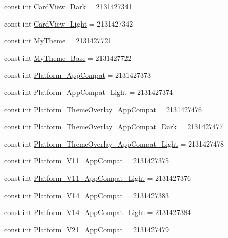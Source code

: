 \begin{CompactItemize}
\item 
const int \hyperlink{class__2doo_1_1_droid_1_1_resource_1_1_style_6378008010174970fbe1b489687a9181}{CardView\_\-Dark} = 2131427341
\item 
const int \hyperlink{class__2doo_1_1_droid_1_1_resource_1_1_style_01532052b5b8563a55f822d24905349c}{CardView\_\-Light} = 2131427342
\item 
const int \hyperlink{class__2doo_1_1_droid_1_1_resource_1_1_style_ef15d60d8f145604b7cfd9701fddc784}{MyTheme} = 2131427721
\item 
const int \hyperlink{class__2doo_1_1_droid_1_1_resource_1_1_style_5cb0bee74161e98760a723023f2b74db}{MyTheme\_\-Base} = 2131427722
\item 
const int \hyperlink{class__2doo_1_1_droid_1_1_resource_1_1_style_188184b20b44c40aa843c9a8d5871037}{Platform\_\-AppCompat} = 2131427373
\item 
const int \hyperlink{class__2doo_1_1_droid_1_1_resource_1_1_style_2dfc295e7ac870e19c4c441a793ae52c}{Platform\_\-AppCompat\_\-Light} = 2131427374
\item 
const int \hyperlink{class__2doo_1_1_droid_1_1_resource_1_1_style_78fb27541e9eb61bf3c01f32b33bc623}{Platform\_\-ThemeOverlay\_\-AppCompat} = 2131427476
\item 
const int \hyperlink{class__2doo_1_1_droid_1_1_resource_1_1_style_b1e77cb778266644a02e925f313a2543}{Platform\_\-ThemeOverlay\_\-AppCompat\_\-Dark} = 2131427477
\item 
const int \hyperlink{class__2doo_1_1_droid_1_1_resource_1_1_style_1fde3578028d57a7db2e03fe9bd59cd4}{Platform\_\-ThemeOverlay\_\-AppCompat\_\-Light} = 2131427478
\item 
const int \hyperlink{class__2doo_1_1_droid_1_1_resource_1_1_style_175dd82615942df31933b57238edc5e5}{Platform\_\-V11\_\-AppCompat} = 2131427375
\item 
const int \hyperlink{class__2doo_1_1_droid_1_1_resource_1_1_style_2f55b462f1f5d3eaefc5a0e283cf54e5}{Platform\_\-V11\_\-AppCompat\_\-Light} = 2131427376
\item 
const int \hyperlink{class__2doo_1_1_droid_1_1_resource_1_1_style_7426cf85605edeb6052e8782dc0b6e4e}{Platform\_\-V14\_\-AppCompat} = 2131427383
\item 
const int \hyperlink{class__2doo_1_1_droid_1_1_resource_1_1_style_58c31f6644636a0dd7be3a85efd7dd03}{Platform\_\-V14\_\-AppCompat\_\-Light} = 2131427384
\item 
const int \hyperlink{class__2doo_1_1_droid_1_1_resource_1_1_style_82024f237bf460cb0ab1a95f9b391b95}{Platform\_\-V21\_\-AppCompat} = 2131427479

\end{CompactItemize}
